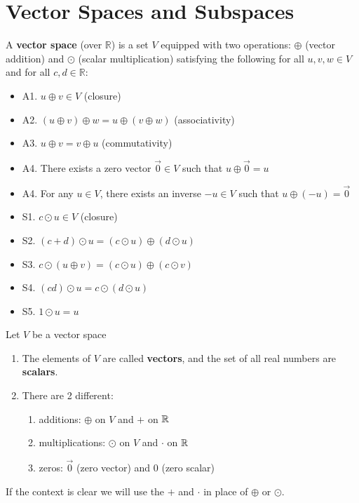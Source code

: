 \newpage
\section{Vector Spaces and Subspaces}

\begin{definition}
A \textbf{vector space} (over $\mathbb{R}$) is a set $V$ equipped with two operations: $\oplus$ (vector addition) and $\odot$ (scalar multiplication) satisfying the following for all $u, v, w \in V$ and for all $c, d \in \mathbb{R}$:
\begin{itemize}
    \item A1. $u \oplus v \in V$ (closure)
    \item A2. $(u \oplus v) \oplus w = u \oplus (v \oplus w)$ (associativity)
    \item A3. $u \oplus v = v \oplus u$ (commutativity)
    \item A4. There exists a zero vector $\vec{0} \in V$ such that $u \oplus \vec{0} = u$
    \item A4. For any $u \in V$, there exists an inverse $-u \in V$ such that $u \oplus (-u) = \vec{0}$ \\
    \leavevmode
    \item S1. $c \odot u \in V$ (closure)
    \item S2. $(c + d) \odot u = (c \odot u) \oplus (d \odot u)$ 
    \item S3. $c \odot (u \oplus v) = (c \odot u) \oplus (c \odot v)$
    \item S4. $(cd) \odot u = c \odot (d \odot u)$
    \item S5. $1 \odot u = u$
\end{itemize}
\end{definition}

\begin{remark}
Let $V$ be a vector space
\begin{enumerate}
    \item The elements of $V$ are called \textbf{vectors}, and the set of all real numbers are \textbf{scalars}.
    \item There are 2 different:
    \begin{enumerate}
        \item additions: $\oplus$ on $V$ and $+$ on $\mathbb{R}$
        \item multiplications: $\odot$ on $V$ and $\cdot$ on $\mathbb{R}$
        \item zeros: $\vec{0}$ (zero vector) and $0$ (zero scalar)
    \end{enumerate}
\end{enumerate}
If the context is clear we will use the $+$ and $\cdot$ in place of $\oplus$ or $\odot$.
\end{remark}

